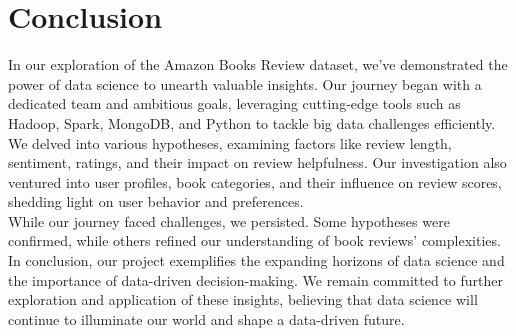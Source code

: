 \section{Conclusion}

In our exploration of the Amazon Books Review dataset,
we've demonstrated the power of data science to unearth valuable insights.
Our journey began with a dedicated team and ambitious goals, leveraging cutting-edge tools such as Hadoop,
Spark, MongoDB, and Python to tackle big data challenges efficiently.\\
We delved into various hypotheses, examining factors like review length, sentiment,
ratings, and their impact on review helpfulness. Our investigation also ventured into user profiles,
book categories, and their influence on review scores, shedding light on user behavior and preferences.\\
While our journey faced challenges, we persisted. Some hypotheses were confirmed,
while others refined our understanding of book reviews' complexities.\\
In conclusion, our project exemplifies the expanding horizons of data science and the importance of
data-driven decision-making. We remain committed to further exploration and application of these insights,
believing that data science will continue to illuminate our world and shape a data-driven future.